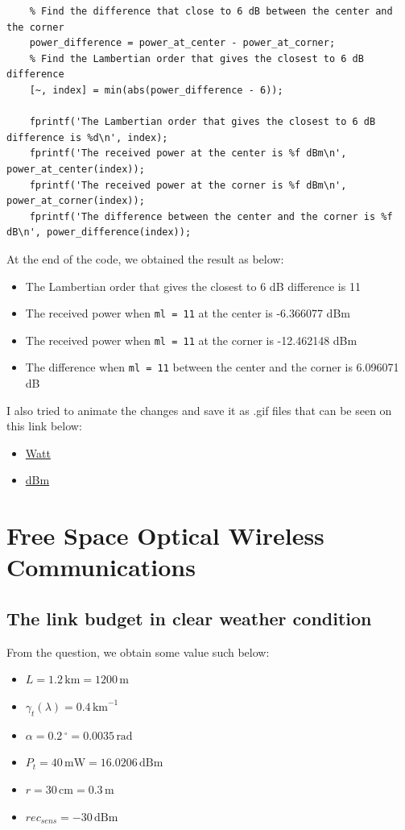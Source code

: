 \documentclass[12pt]{article}
\begin{document}
\begin{lstlisting}
    % Find the difference that close to 6 dB between the center and the corner
    power_difference = power_at_center - power_at_corner;
    % Find the Lambertian order that gives the closest to 6 dB difference
    [~, index] = min(abs(power_difference - 6));
    
    fprintf('The Lambertian order that gives the closest to 6 dB difference is %d\n', index);
    fprintf('The received power at the center is %f dBm\n', power_at_center(index));
    fprintf('The received power at the corner is %f dBm\n', power_at_corner(index));
    fprintf('The difference between the center and the corner is %f dB\n', power_difference(index));
    \end{lstlisting}

    At the end of the code, we obtained the result as below:

    \begin{itemize}
        \item The Lambertian order that gives the closest to 6 dB difference is 11
        \item The received power when \texttt{ml = 11} at the center is -6.366077 dBm
        \item The received power when \texttt{ml = 11} at the corner is -12.462148 dBm
        \item The difference when \texttt{ml = 11} between the center and the corner is 6.096071 dB
    \end{itemize}

    I also tried to animate the changes and save it as .gif files that can be seen on this link below:
    \begin{itemize}
        \item \href{https://raw.githubusercontent.com/mctosima/OWC-NottinghamNTUST-FinalAssignment/main/3D_power_curve_Watt.gif}{Watt}
        \item \href{https://raw.githubusercontent.com/mctosima/OWC-NottinghamNTUST-FinalAssignment/main/3D_power_curve_dBm.gif}{dBm}
    \end{itemize}
    
    
\section{Free Space Optical Wireless Communications}
\subsection{The link budget in clear weather condition}
		From the question, we obtain some value such below:
\begin{itemize}
    \item $\textit{L} = 1.2\, \text{km} = 1200\, \text{m}$
    \item $\gamma_{t}(\lambda) = 0.4\, \text{km}^{-1}$
    \item $\alpha = 0.2\,^\circ = 0.0035\, \text{rad}$
    \item $P_{t} = 40\, \text{mW} = 16.0206\, \text{dBm}$
    \item $\textit{r} = 30\, \text{cm} = 0.3\, \text{m}$
    \item $\textit{rec}_{sens} = -30\, \text{dBm}$
\end{itemize}
\end{document}
